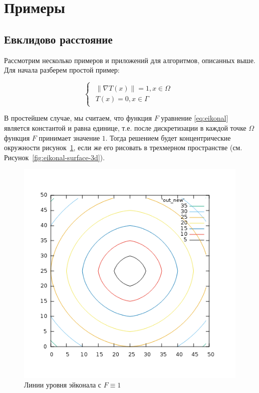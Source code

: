 \section{Примеры}
\label{sec:samples}

\subsection{Евклидово расстояние}
\label{sec:simple-eikonal}

Рассмотрим несколько примеров и приложений для алгоритмов, описанных
выше. Для начала разберем простой пример:


\begin{equation}
  \label{eq:eik-sur}
  \begin{cases} \begin{array}{ll}
      \| \nabla T(x) \| = 1, x \in \Omega \\
      T(x) = 0, x \in \Gamma
    \end{array}\end{cases}
\end{equation}

В простейшем случае, мы считаем, что функция $F$ уравнение
\eqref{eq:eikonal} является константой и равна единице, т.е. после
дискретизации в каждой точке $\Omega$ функция $F$ принимает значение
$1$. Тогда решением будет концентрические окружности
рисунок~\ref{fig:eikonal-surface}, если же его рисовать в трехмерном
пространстве (см. Рисунок~\ref{fig:eikonal-surface-3d}).

\begin{figure}[H]
  \centering
  \includegraphics[width=0.7\linewidth]{img/eikonal_simple_surface.png}
  \hfil \caption{Линии уровня эйконала с $F\equiv 1$ }
  \label{fig:eikonal-surface}
\end{figure}

